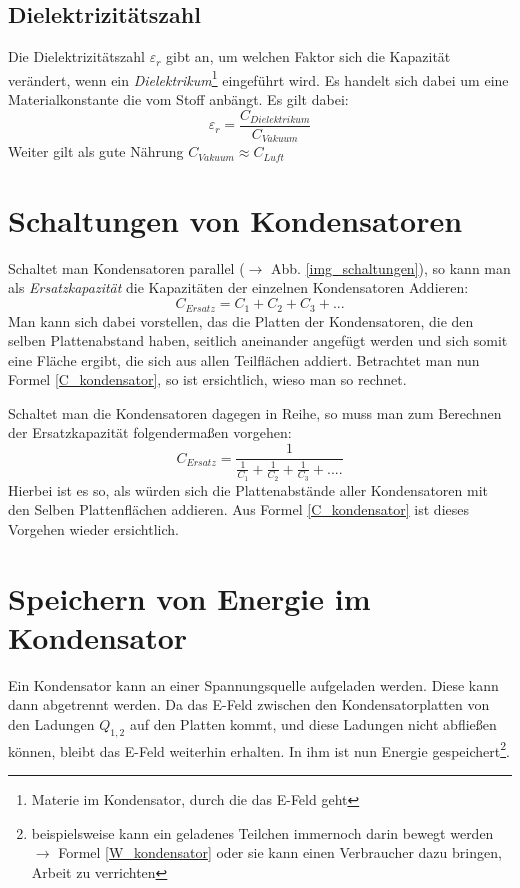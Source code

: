 		\subsection{Dielektrizitätszahl}
		\label{kap_epsilon_r}
Die Dielektrizitätszahl \(\varepsilon_r\) gibt an, um welchen Faktor sich die Kapazität verändert, wenn ein \textit{Dielektrikum}\footnote{Materie im Kondensator, durch die das E-Feld geht} eingeführt wird. Es handelt sich dabei um eine Materialkonstante die vom Stoff anbängt. Es gilt dabei:
	\begin{equation}
	\varepsilon_r = \frac{C_{Dielektrikum}}{C_{Vakuum}}
	\label{def_epsilon_r}
	\end{equation}
Weiter gilt als gute Nährung \(C_{Vakuum} \approx C_{Luft}\) 	


		\section{Schaltungen von Kondensatoren}
Schaltet man Kondensatoren parallel (\(\rightarrow\) Abb. \ref{img_schaltungen}), so kann man als \textit{Ersatzkapazität} die Kapazitäten der einzelnen Kondensatoren Addieren:
	\begin{equation}
	C_{Ersatz} = C_1 + C_2 + C_3 + ...
	\end{equation}
Man kann sich dabei vorstellen, das die Platten der Kondensatoren, die den selben Plattenabstand haben, seitlich aneinander angefügt werden und sich somit eine Fläche ergibt, die sich aus allen Teilflächen addiert. Betrachtet man nun Formel \ref{C_kondensator}, so ist ersichtlich, wieso man so rechnet.

Schaltet man die Kondensatoren dagegen in Reihe, so muss man zum Berechnen der Ersatzkapazität folgendermaßen vorgehen:
	\begin{equation}
	C_{Ersatz} = \frac{1}{\frac{1}{C_1} + \frac{1}{C_2} + \frac{1}{C_3} + ....}
	\end{equation}
Hierbei ist es so, als würden sich die Plattenabstände aller Kondensatoren mit den Selben Plattenflächen addieren. Aus Formel \ref{C_kondensator} ist dieses Vorgehen wieder ersichtlich.


		\section{Speichern von Energie im Kondensator}	
Ein Kondensator kann an einer Spannungsquelle aufgeladen werden. Diese kann dann abgetrennt werden. Da das E-Feld zwischen den Kondensatorplatten von den Ladungen \(Q_{1,2}\) auf den Platten kommt, und diese Ladungen nicht abfließen können, bleibt das E-Feld weiterhin erhalten. In ihm ist nun Energie gespeichert\footnote{beispielsweise kann ein geladenes Teilchen immernoch darin bewegt werden \(\rightarrow\) Formel \ref{W_kondensator} oder sie kann einen Verbraucher dazu bringen, Arbeit zu verrichten}.

